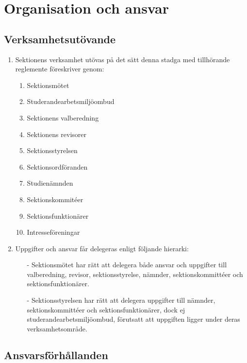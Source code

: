 \documentclass[11pt,a4paper]{article}
\begin{document}
\section{Organisation och ansvar}

\subsection{Verksamhetsutövande}

\begin{enumerate}[\thesubsection .1]

   \item Sektionens verksamhet ut\-övas på det sätt denna stadga med
   till\-hör\-ande regle\-mente föreskriver genom:
      \begin{enumerate}[1]
         \item Sektionsmötet
         \item Studerandearbetsmiljöombud
         \item Sektionens valberedning
         \item Sektionens revisorer
         \item Sektionsstyrelsen
	 	 \item Sektionsordföranden
         \item Studienämnden
         \item Sektionskommitéer
         \item Sektionsfunktionärer
         \item Intresseföreningar
      \end{enumerate}

	\item Uppgifter och ansvar får delegeras enligt följande hierarki:
		\begin{enumerate}
			\item[-] Sektionsmötet har rätt att delegera både ansvar och uppgifter till valberedning, revisor, sektionsstyrelse, nämnder, sektionskommittéer och sektionsfunktionärer.
			\item[-] Sektionsstyrelsen har rätt att delegera uppgifter till nämnder,  sektionskommittéer och sektionsfunktionärer, dock ej studerandearbetsmiljöombud, förutsatt att uppgiften ligger under deras verksamhetsområde.
		\end{enumerate}

\end{enumerate}

\subsection{Ansvarsförhållanden}
\end{document}
